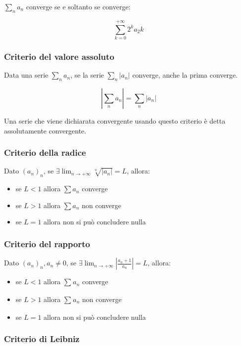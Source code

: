 \documentclass{subfiles}
\begin{document}
$\sum_{n} a_n$ converge se e soltanto se converge:

$$
\sum_{k = 0}^{+\infty} 2^k a_2k
$$

\subsubsection{Criterio del valore assoluto}

Data una serie $\sum_{n}a_n$, se la serie $\sum_{n}|a_n|$ converge, anche la prima converge.

$$
|\sum_{n}a_n| = \sum_{n}|a_n|
$$

\noindent
Una serie che viene dichiarata convergente usando questo criterio è detta assolutamente convergente.

\subsubsection{Criterio della radice}

Dato $(a_n)_n$, se $\exists \lim_{n \to +\infty} \sqrt[n]{|a_n|} = L$, allora:

\begin{itemize}
    \item se $L < 1$ allora $\sum a_n$ converge
    \item se $L > 1$ allora $\sum a_n$ non converge
    \item se $L = 1$ allora non si può concludere nulla
\end{itemize}

\subsubsection{Criterio del rapporto}

Dato $(a_n)_n, a_n \neq 0$, se $\exists \lim_{n \to +\infty} |\frac{a_n + 1}{a_n}| = L$, allora:

\begin{itemize}
    \item se $L < 1$ allora $\sum_{}^{} a_n$ converge
    \item se $L > 1$ allora $\sum_{}^{} a_n$ non converge
    \item se $L = 1$ allora non si può concludere nulla
\end{itemize}

\subsubsection{Criterio di Leibniz}
\end{document}
